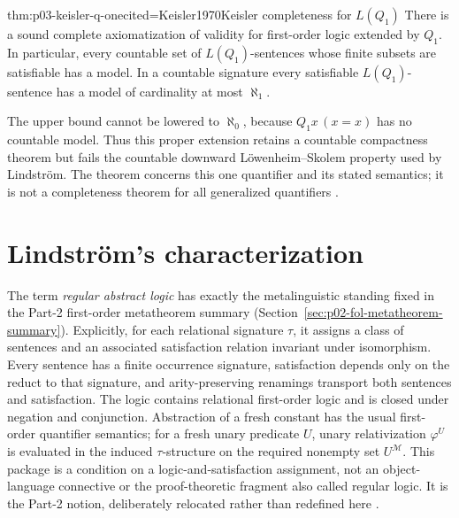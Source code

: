 \begin{hbtheorem}{thm:p03-keisler-q-one}{cited=Keisler1970}{Keisler completeness for \(L(Q_1)\)}
There is a sound complete axiomatization of validity for first-order logic
extended by \(Q_1\).  In particular, every countable set of
\(L(Q_1)\)-sentences whose finite subsets are satisfiable has a model.  In a
countable signature every satisfiable \(L(Q_1)\)-sentence has a model of
cardinality at most \(\aleph_1\).
\end{hbtheorem}

The upper bound cannot be lowered to \(\aleph_0\), because
\(Q_1x\,(x=x)\) has no countable model.  Thus this proper extension retains a
countable compactness theorem but fails the countable downward
L\"owenheim--Skolem property used by Lindstr\"om.  The theorem concerns this
one quantifier and its stated semantics; it is not a completeness theorem for
all generalized quantifiers \cite{Mostowski1957,Lindstrom1966,Keisler1970}.

\section{Lindstr\"om's characterization}
\label{sec:p03-lindstrom}

The term \emph{regular abstract logic} has exactly the metalinguistic standing
fixed in the Part-2 first-order metatheorem summary
(Section~\ref{sec:p02-fol-metatheorem-summary}).  Explicitly, for each
relational signature \(\tau\), it assigns a class of sentences and an
associated satisfaction relation invariant under isomorphism.  Every sentence
has a finite occurrence signature, satisfaction depends only on the reduct to
that signature, and arity-preserving renamings transport both sentences and
satisfaction.  The logic contains relational first-order logic and is closed
under negation and conjunction.  Abstraction of a fresh constant has the usual
first-order quantifier semantics; for a fresh unary predicate \(U\), unary
relativization \(\varphi^U\) is evaluated in the induced \(\tau\)-structure on
the required nonempty set \(U^{\mathcal M}\).  This package is a condition on a
logic-and-satisfaction assignment, not an object-language connective or the
proof-theoretic fragment also called regular logic.  It is the Part-2 notion,
deliberately relocated rather than redefined here
\cite[Chapter~XIII, \S1]{EbbinghausFlumThomas1994}.

